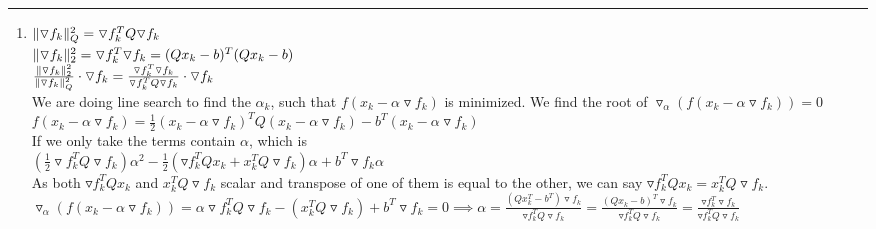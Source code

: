 \documentclass[11pt]{article}
\begin{document}





\begin{quote}

\end{quote}

\hrule

\begin{solution}
\item 

\begin{enumerate}
    \item $\mathopen\| \triangledown f_k \mathclose\|_Q^2 = \triangledown f_k^T Q \triangledown f_k$ \\
    $\mathopen\| \triangledown f_k \mathclose\|_2^2 = \triangledown f_k^T \triangledown f_k = (Qx_k - b)^T (Qx_k - b)$\\
    $\frac{\mathopen\| \triangledown f_k \mathclose\|_2^2}{\mathopen\| \triangledown f_k \mathclose\|_Q^2}\cdot  \triangledown f_k = \frac{\triangledown f_k^T \triangledown f_k}{\triangledown f_k^T Q \triangledown f_k}\cdot  \triangledown f_k$\\
    
    We are doing line search to find the $\alpha_k$, such that $f(x_k - \alpha \triangledown f_k)$ is minimized. We find the root of $\triangledown_\alpha(f(x_k - \alpha \triangledown f_k)) = 0$\\
        
    $f(x_k - \alpha \triangledown f_k) = \frac{1}{2} (x_k - \alpha \triangledown f_k)^T Q (x_k - \alpha \triangledown f_k) - b^T (x_k - \alpha \triangledown f_k)$ \\
    If we only take the terms contain $\alpha$, which is\\
    $(\frac{1}{2}\triangledown f_k^T Q \triangledown f_k)\alpha^2 - \frac{1}{2}(\triangledown f_k^T Q x_k + x_k^T Q \triangledown f_k)\alpha + b^T \triangledown f_k \alpha$\\
    
    As both $\triangledown f_k^T Q x_k$ and $x_k^T Q \triangledown f_k$ scalar and transpose of one of them is equal to the other, we can say $\triangledown f_k^T Q x_k = x_k^T Q \triangledown f_k$. \\
    
    $\triangledown_\alpha(f(x_k - \alpha \triangledown f_k)) = \alpha \triangledown f_k^T Q \triangledown f_k - ( x_k^T Q \triangledown f_k) + b^T \triangledown f_k = 0 \implies \alpha = \frac{(Qx_k^T - b^T) \triangledown f_k}{\triangledown f_k^T Q \triangledown f_k} = \frac{(Qx_k - b)^T \triangledown f_k}{\triangledown f_k^T Q \triangledown f_k} = \frac{\triangledown f_k^T \triangledown f_k}{\triangledown f_k^T Q \triangledown f_k}$\\
    

\end{enumerate}
\end{solution}
\end{document}
